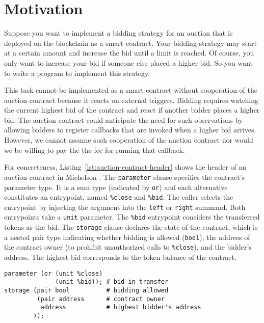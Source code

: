 \documentclass[runningheads]{llncs}
\begin{document}
\section{Motivation}
\label{sec:motivation}

Suppose you want to implement a bidding strategy for an auction that
is deployed on the blockchain as a smart contract.
Your bidding strategy may start at a certain amount and increase the bid until a
limit is reached. Of course, you only want to increase your bid if
someone else placed a higher bid. So you want to write a
program to implement this strategy.

This task cannot be implemented as a smart contract without
cooperation of the auction contract because it reacts
on external triggers.
Bidding requires watching the current highest bid of the contract and
react if another bidder places a higher bid.
The auction contract could anticipate the need for such observations
by allowing bidders to register callbacks that are invoked when a
higher bid arrives. However, we cannot assume such cooperation of the
auction contract nor would we be willing to pay the the fee for running
that callback.

For concreteness, Listing~\ref{lst:auction-contract-header} shows the
header of an auction contract in Michelson \cite{michelson}. The
\lstinline/parameter/ clause specifies the contract's parameter
type. It is a sum type (indicated by \lstinline/or/) and each
alternative constitutes an entrypoint, named \lstinline/%close/ and
\lstinline/%bid/. The caller selects the entrypoint by injecting the argument into the
\lstinline/left/ or \lstinline/right/ summand. Both entrypoints take a \lstinline/unit/
parameter. The \lstinline/%bid/ entrypoint considers the transferred
tokens as the bid.
The \lstinline/storage/ clause declares the state of the contract,
which is a nested pair type indicating whether bidding is allowed
(\lstinline/bool/), the address of the contract owner (to prohibit
unauthorized calls to \lstinline/%close/), and the bidder's
address. The highest bid corresponds to the token balance of the contract.
\begin{lstlisting}[language=michelson,numbers=none,float,caption={Header of the auction contract},label={lst:auction-contract-header},captionpos=b,emph={close,bid},emphstyle=\underbar]
parameter (or (unit %close)
              (unit %bid)); # bid in transfer
storage (pair bool          # bidding allowed
         (pair address      # contract owner
          address           # highest bidder's address
        ));
\end{lstlisting}
\end{document}
